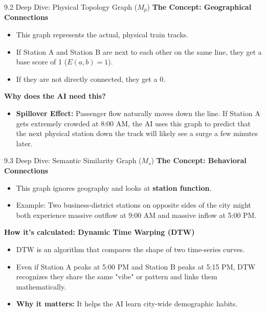 \documentclass[aspectratio=169]{beamer}
\begin{document}
\begin{frame}{9.2 Deep Dive: Physical Topology Graph ($M_p$)}
    \textbf{The Concept: Geographical Connections}
    \begin{itemize}
        \item This graph represents the actual, physical train tracks.
        \item If Station A and Station B are next to each other on the same line, they get a base score of 1 ($E(a,b)=1$).
        \item If they are not directly connected, they get a 0.
    \end{itemize}

    \vspace{0.3cm}
    \textbf{Why does the AI need this?}
    \begin{itemize}
        \item \textbf{Spillover Effect:} Passenger flow naturally moves down the line. If Station A gets extremely crowded at 8:00 AM, the AI uses this graph to predict that the next physical station down the track will likely see a surge a few minutes later.
    \end{itemize}
\end{frame}

\begin{frame}{9.3 Deep Dive: Semantic Similarity Graph ($M_s$)}
    \textbf{The Concept: Behavioral Connections}
    \begin{itemize}
        \item This graph ignores geography and looks at \textbf{station function}. 
        \item Example: Two business-district stations on opposite sides of the city might both experience massive outflow at 9:00 AM and massive inflow at 5:00 PM. 
    \end{itemize}

    \vspace{0.3cm}
    \textbf{How it's calculated: Dynamic Time Warping (DTW)}
    \begin{itemize}
        \item DTW is an algorithm that compares the shape of two time-series curves.
        \item Even if Station A peaks at 5:00 PM and Station B peaks at 5:15 PM, DTW recognizes they share the same "vibe" or pattern and links them mathematically.
        \item \textbf{Why it matters:} It helps the AI learn city-wide demographic habits.
    \end{itemize}
\end{frame}
\end{document}
